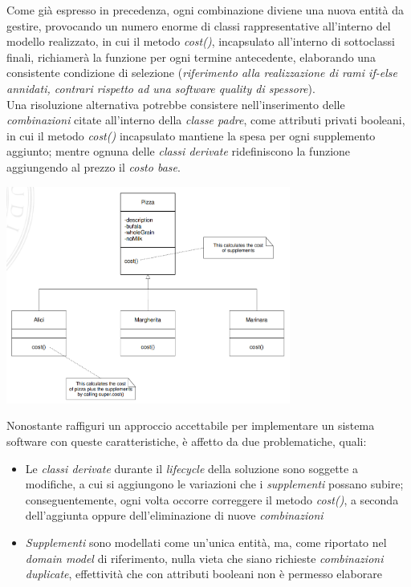 \documentclass{article}
\begin{document}
Come già espresso in precedenza, ogni combinazione diviene una nuova entità da gestire, provocando un numero enorme di classi rappresentative all'interno del modello realizzato, in cui il metodo \textit{cost()}, incapsulato all'interno di sottoclassi finali, richiamerà la funzione per ogni termine antecedente, elaborando una consistente condizione di selezione (\textit{riferimento alla realizzazione di rami if-else annidati, contrari rispetto ad una software quality di spessore}).\vspace*{14pt}\\
Una risoluzione alternativa potrebbe consistere nell'inserimento delle \textit{combinazioni} citate all'interno della \textit{classe padre}, come attributi privati booleani, in cui il metodo \textit{cost()} incapsulato mantiene la spesa per ogni supplemento aggiunto; mentre ognuna delle \textit{classi derivate} ridefiniscono la funzione aggiungendo al prezzo il \textit{costo base}.\vspace*{7pt}
\begin{center}
    \includegraphics[width=0.7\textwidth]{foto 4.png}
\end{center}  
Nonostante raffiguri un approccio accettabile per implementare un sistema software con queste caratteristiche, è affetto da due problematiche, quali:
\begin{itemize}[label={-}]
    \itemsep0em
    \item Le \textit{classi derivate} durante il \textit{lifecycle} della soluzione sono soggette a modifiche, a cui si aggiungono le variazioni che i \textit{supplementi} possano subire; conseguentemente, ogni volta occorre correggere il metodo \textit{cost()}, a seconda dell'aggiunta oppure dell'eliminazione di nuove \textit{combinazioni}    
    \item \textit{Supplementi} sono modellati come un'unica entità, ma, come riportato nel \textit{domain model} di riferimento, nulla vieta che siano richieste \textit{combinazioni duplicate}, effettività che con attributi booleani non è permesso elaborare
\end{itemize} 
\end{document}
